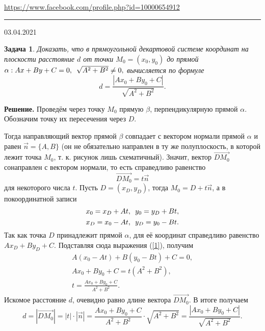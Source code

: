 \documentclass[12pt]{article}
\begin{document}


\begin{flushleft}
\url{https://www.facebook.com/profile.php?id=10000654912}
\end{flushleft}
\hrule 
\begin{flushright}
03.04.2021
\end{flushright}
\bigskip


\newtheorem*{task}{Задача}
\begin{task}
Доказать, что в прямоугольной декартовой системе координат на плоскости расстояние $d$ от точки $M_0 = (x_0, y_0)$ до прямой $\alpha: Ax+By+C=0, \enskip \sqrt{A^2+B^2} \neq 0,$ вычисляется по формуле
\begin{equation*}
    d = \frac{|Ax_0+By_0+C|}{\sqrt{A^2+B^2}}.
\end{equation*}
\end{task}

\noindent\textbf{Решение.} Проведём через точку $M_0$ прямую $\beta$, перпендикулярную прямой $\alpha$. Обозначим точку их пересечения через $D$.
\begin{figure}[ht]\centering
    \def\svgwidth{7cm}
    
\end{figure}

\noindent Тогда направляющий вектор прямой $\beta$ совпадает с вектором нормали прямой $\alpha$ и равен $\vec{n} = \{A,B\}$ (он не обязательно направлен в ту же полуплоскость, в которой лежит точка $M_0$, т. к. рисунок лишь схематичный). Значит, вектор $\overrightarrow{DM_0}$ сонаправлен с вектором нормали, то есть справедливо равенство
\begin{equation*}
    \overrightarrow{DM_0} = t\vec{n}
\end{equation*}
для некоторого числа $t$. Пусть $D = (x_D, y_D)$, тогда $M_0 = D + t\vec{n}$, а в покоординатной записи 
\begin{equation*}
    x_0 = x_D + At, \enskip y_0 = y_D + Bt,
\end{equation*}
\begin{equation}
    \label{1}x_D = x_0 - At, \enskip y_D = y_0 - Bt.
\end{equation}
Так как точка $D$ принадлежит прямой $\alpha$, для её координат справедливо равенство $Ax_D + By_D + C$. Подставляя сюда выражения (\ref{1}), получим
\begin{gather*}
    A(x_0 - At) + B(y_0 - Bt) + C = 0, \\
    Ax_0 + By_0+C = t(A^2 + B^2), \\
    t = \frac{Ax_0+By_0+C} {A^2 + B^2}.
\end{gather*}
Искомое расстояние $d$, очевидно равно длине вектора $\overrightarrow{DM_0}$. В итоге получаем
\begin{equation*}
    d = |\overrightarrow{DM_0}| = |t|\cdot|\vec{n}|
    = \frac{Ax_0+By_0+C} {A^2 + B^2} \cdot \sqrt{A^2 + B^2} = \frac{|Ax_0+By_0+C|}{\sqrt{A^2+B^2}}.
\end{equation*}
\end{document}
